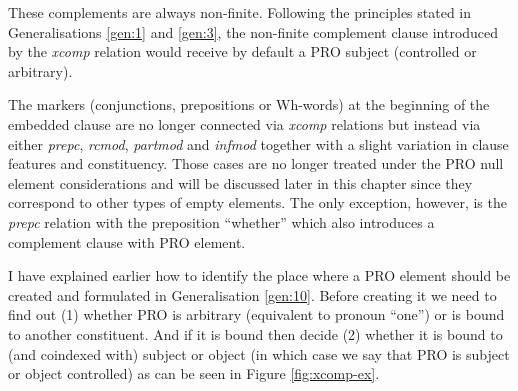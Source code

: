     These complements are always non-finite. Following the principles stated in Generalisations \ref{gen:1} and \ref{gen:3}, the non-finite complement clause introduced by the \textit{xcomp} relation would receive by default a PRO subject (controlled or arbitrary).

    The markers (conjunctions, prepositions or Wh-words) at the beginning of the embedded clause are no longer connected via \textit{xcomp} relations but instead via either \textit{prepc}, \textit{rcmod}, \textit{partmod} and \textit{infmod} together with a slight variation in clause features and constituency. Those cases are no longer treated under the PRO null element considerations and will be discussed later in this chapter since they correspond to other types of empty elements. The only exception, however, is the \textit{prepc} relation with the preposition ``whether'' which also introduces a complement clause with PRO element.


    I have explained earlier how to identify the place where a PRO element should be created and formulated in Generalisation \ref{gen:10}. Before creating it we need to find out (1) whether PRO is arbitrary (equivalent to pronoun ``one'') or is bound to another constituent. And if it is bound then decide (2) whether it is bound to (and coindexed with) subject or object (in which case we say that PRO is subject or object controlled) as can be seen in Figure \ref{fig:xcomp-ex}.

